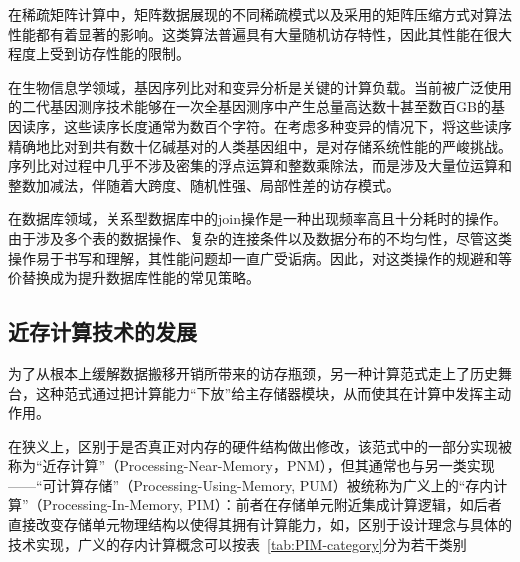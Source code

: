     在稀疏矩阵计算中，矩阵数据展现的不同稀疏模式以及采用的矩阵压缩方式对算法性能都有着显著的影响。这类算法普遍具有大量随机访存特性，因此其性能在很大程度上受到访存性能的限制。
    
    在生物信息学领域，基因序列比对和变异分析是关键的计算负载。当前被广泛使用的二代基因测序技术能够在一次全基因测序中产生总量高达数十甚至数百GB的基因读序，这些读序长度通常为数百个字符。在考虑多种变异的情况下，将这些读序精确地比对到共有数十亿碱基对的人类基因组中，是对存储系统性能的严峻挑战。序列比对过程中几乎不涉及密集的浮点运算和整数乘除法，而是涉及大量位运算和整数加减法，伴随着大跨度、随机性强、局部性差的访存模式。

    在数据库领域，关系型数据库中的join操作是一种出现频率高且十分耗时的操作。由于涉及多个表的数据操作、复杂的连接条件以及数据分布的不均匀性，尽管这类操作易于书写和理解，其性能问题却一直广受诟病。因此，对这类操作的规避和等价替换成为提升数据库性能的常见策略。
    
    \subsection{近存计算技术的发展}\label{subsec:evolution_of_PNM}
    为了从根本上缓解数据搬移开销所带来的访存瓶颈，另一种计算范式走上了历史舞台，这种范式通过把计算能力“下放”给主存储器模块，从而使其在计算中发挥主动作用。
    
    在狭义上，区别于是否真正对内存的硬件结构做出修改，该范式中的一部分实现被称为“近存计算”（Processing-Near-Memory，PNM），但其通常也与另一类实现——“可计算存储”（Processing-Using-Memory, PUM）被统称为广义上的“存内计算”（Processing-In-Memory, PIM）：前者在存储单元附近集成计算逻辑，如\citep{chang_energy-efficient_2021}\citep{fernandez_natsa_2020}后者直接改变存储单元物理结构以使得其拥有计算能力，如\citep{tu_multcim_2023}\citep{zhang_edge_2023}，区别于设计理念与具体的技术实现，广义的存内计算概念可以按表~\ref{tab:PIM-category}分为若干类别

